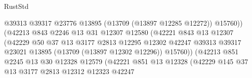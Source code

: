 \begin{lexlean}{RustStd}
\begin{coremodule}
                                          @39313
                                          @39317
                                          @23776
                                          @13895
                                          (@13709 (@13897 @12285 @12272))
                                          @15760))
                                      (@42213
                                        @843
                                        @2246
                                        @13
                                        @31
                                        @12307
                                        @12580
                                        (@42221
                                          @843
                                          @13
                                          @12307
                                          (@42229
                                            @50
                                            @37
                                            @13
                                            @3177
                                            @2813
                                            @12295
                                            @12302
                                            @42247
                                            @39313
                                            @39317
                                            @23021
                                            @13895
                                            (@13709 (@13897 @12302 @12296))
                                            @15760))
                                        (@42213
                                          @851
                                          @2245
                                          @13
                                          @30
                                          @12328
                                          @12579
                                          (@42221
                                            @851
                                            @13
                                            @12328
                                            (@42229
                                              @145
                                              @37
                                              @13
                                              @3177
                                              @2813
                                              @12312
                                              @12323
                                              @42247

\end{coremodule}
\end{lexlean}
